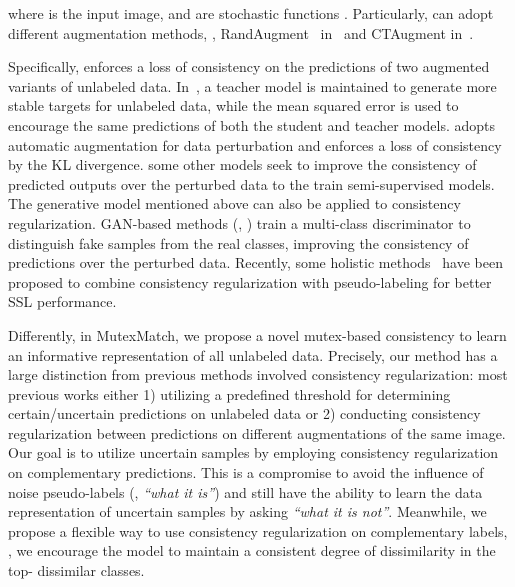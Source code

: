 \documentclass[lettersize,journal]{IEEEtran}
\theoremstyle{plain}
\theoremstyle{definition}
\theoremstyle{remark}
\begin{document}
where  is the input image,  and  are stochastic functions \cite{bachman2014learning}. 
Particularly,  can adopt different augmentation methods, \eg,
RandAugment~\cite{sohn2020fixmatch} in~\cite{sohn2020fixmatch} and CTAugment in~\cite{berthelot2020remixmatch}. 

Specifically, \cite{laine2016temporal} enforces a loss of consistency on the predictions of two augmented variants of unlabeled data.
In~\cite{tarvainen2017mean}, a teacher model is maintained to generate more stable targets for unlabeled data, while the mean squared error is used to encourage the same predictions of both the student and teacher models.
\cite{xie2020unsupervised} adopts automatic augmentation for data perturbation and enforces a loss of consistency by the KL divergence.  some other models seek to improve the consistency of predicted outputs over the perturbed data to
the train semi-supervised models. The generative model mentioned above can also be applied to consistency regularization. GAN-based methods (\eg, \cite{wei2018improving,qi2020loss}) train a multi-class discriminator to distinguish fake samples from the real classes,  improving the consistency of predictions over the perturbed data.
Recently, some holistic methods~\cite{berthelot2020remixmatch,sohn2020fixmatch,li2021comatch,guiimproving} have been proposed to combine consistency regularization with pseudo-labeling for better SSL performance. 

Differently, in MutexMatch,  we propose a novel mutex-based consistency to learn an informative representation of all unlabeled data.  
Precisely, our method has a large distinction from previous methods involved consistency regularization: most previous works either 1) utilizing a predefined threshold for determining certain/uncertain predictions on unlabeled data or 2) conducting consistency regularization between predictions on different augmentations of the same image. Our goal is to utilize uncertain samples by employing consistency regularization on complementary predictions. This is a compromise to avoid the influence of noise pseudo-labels (\ie, \textit{``what it is''}) and still have the ability to learn the data representation of uncertain samples by asking \textit{``what it is not''}. Meanwhile, we propose a flexible way to use consistency regularization on complementary labels, \ie, we encourage the model to maintain a consistent degree of dissimilarity in the top- dissimilar classes.  
\end{document}
